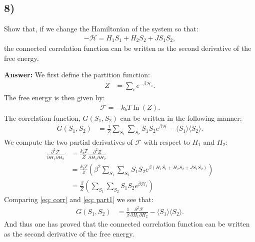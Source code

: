 \documentclass[a4paper]{article}
\newcommand{\newparagraph}{\vspace{.5cm}\noindent}
\newcommand{\average}[1]{\langle #1 \rangle}
\begin{document}
\subsection*{8)}
Show that, if we change the Hamiltonian of the system so that:
\begin{align*}
    -\mathcal{H} = H_1S_1 + H_2S_2 + JS_1S_2,
\end{align*}the connected correlation function can be written as the second derivative of the free energy.

\newparagraph
\textbf{Answer:} We first define the partition function:
\begin{align*}
    Z &= \sum_i e^{-\beta \mathcal{H}_i}.
\end{align*}The free energy is then given by:
\begin{align*}
    \mathcal{F} = -k_b T\ln(Z).
\end{align*}The correlation function, $G(S_1, S_2)$ can be written in the following manner:
\begin{align}
    G(S_1, S_2) &= \frac{1}{Z}\sum_{S_1}\sum_{S_2}S_1S_2e^{\beta \mathcal{H}} - \average{S_1}\average{S_2}.\label{eq: corr}
\end{align}We compute the two partial derivatives of $\mathcal{F}$ with respect to $H_1$ and $H_2$:
\begin{align}
    \frac{\partial^2\mathcal{F}}{\partial H_1\partial H_2} &= \frac{k_bT}{Z}\frac{\partial^2 Z}{\partial H_1\partial H_2}\nonumber\\
    &= \frac{k_bT}{Z}\left(\beta^2\sum_{S_1}\sum_{S_2}S_1S_2e^{\beta(H_1S_1 + H_2S_2 + JS_1S_2)}\right)\nonumber\\
    &= \frac{\beta}{Z} \left(\sum_{S_1}\sum_{S_2}S_1S_2e^{\beta\mathcal{H}_i}\right)\label{eq: part1}
\end{align}Comparing \eqref{eq: corr} and \eqref{eq: part1} we see that:
\begin{align*}
    G(S_1, S_2) &= \frac{1}{\beta}\frac{\partial^2\mathcal{F}}{\partial H_1\partial H_2} - \average{S_1}\average{S_2}.
\end{align*}And thus one has proved that the connected correlation function can be written as the second derivative of the free energy.
\end{document}
